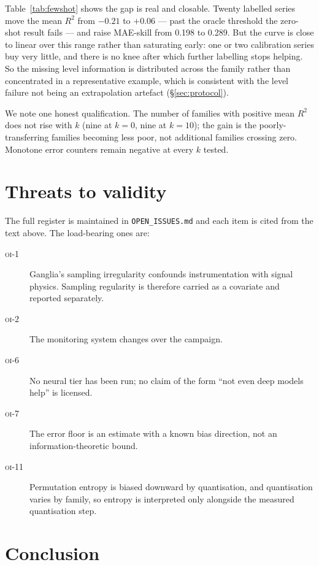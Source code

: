 \documentclass[11pt,a4paper]{article}
\newcommand{\num}[1]{#1}
\newcommand{\oi}[1]{\textsc{oi-#1}}
\begin{document}
Table~\ref{tab:fewshot} shows the gap is real and closable. Twenty labelled
series move the mean \(R^2\) from \(-0.21\) to \(+0.06\) --- past the oracle
threshold the zero-shot result fails --- and raise MAE-skill from \num{0.198} to
\num{0.289}. But the curve is close to linear over this range rather than
saturating early: one or two calibration series buy very little, and there is no
knee after which further labelling stops helping. So the missing level
information is distributed across the family rather than concentrated in a
representative example, which is consistent with the level failure not being an
extrapolation artefact (\S\ref{sec:protocol}).

We note one honest qualification. The number of families with positive mean
\(R^2\) does not rise with \(k\) (nine at \(k=0\), nine at \(k=10\)); the gain
is the poorly-transferring families becoming less poor, not additional families
crossing zero. Monotone error counters remain negative at every \(k\) tested.

\section{Threats to validity}
\label{sec:threats}

The full register is maintained in \texttt{OPEN\_ISSUES.md} and each item is
cited from the text above. The load-bearing ones are:

\begin{description}
  \item[\oi{1}] Ganglia's sampling irregularity confounds instrumentation with
        signal physics. Sampling regularity is therefore carried as a covariate
        and reported separately.
  \item[\oi{2}] The monitoring system changes over the campaign.
  \item[\oi{6}] No neural tier has been run; no claim of the form ``not even
        deep models help'' is licensed.
  \item[\oi{7}] The error floor is an estimate with a known bias direction, not
        an information-theoretic bound.
  \item[\oi{11}] Permutation entropy is biased downward by quantisation, and
        quantisation varies by family, so entropy is interpreted only alongside
        the measured quantisation step.
\end{description}

\section{Conclusion}
\end{document}

